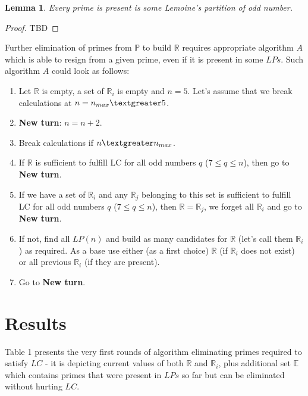 \documentclass[10pt,twocolumn]{article}
\newtheorem{lemma}[theorem]{Lemma}
\begin{document}
\begin{lemma}
Every prime is present is some Lemoine's  partition of odd number.
\end{lemma}
\begin{proof}
TBD
\end{proof}

Further elimination of primes from $\mathbb{P}$ to build $\mathbb{R}$ requires appropriate algorithm $A$ which is able to resign from a given prime, even if it is present in some $LPs$. Such algorithm $A$ could look as follows:

\begin{enumerate}
\item  Let $\mathbb{R}$ is empty, a set of $\mathbb{R}_i$ is empty and $n = 5$. Let's assume that we break calculations at $n = n_{max} \textgreater 5$.
\item  \textbf{New turn}: $n = n + 2$.
\item Break calculations if $n \textgreater n_{max}$.
\item  If  $\mathbb{R}$ is sufficient to fulfill LC for all odd numbers $q$ ($ 7 \leq q \leq n$), then go to \textbf{New turn}.
\item  If  we have a set of  $\mathbb{R}_i$ and any $\mathbb{R}_j$ belonging to this set is sufficient to fulfill LC for all odd numbers $q$ ($ 7 \leq q \leq n$), then $\mathbb{R} = \mathbb{R}_j$, we forget all $\mathbb{R}_i$ and go to \textbf{New turn}.
\item  If  not, find all $LP(n)$ and build as many candidates for $\mathbb{R}$ (let's call them $\mathbb{R}_i$) as required. As a base use either (as a first choice) $\mathbb{R}$ (if $\mathbb{R}_i$ does not exist) or all previous $\mathbb{R}_i$ (if they are present).
\item Go to \textbf{New turn}.
\end{enumerate}

\section{Results}

Table 1 presents the very first rounds of algorithm eliminating primes required to satisfy $LC$ - it is depicting current values of both $\mathbb{R}$ and $\mathbb{R}_i$, plus additional set $\mathbb{E}$ which contains primes that were present in $LPs$ so far but can be eliminated without hurting $LC$. 
\end{document}
